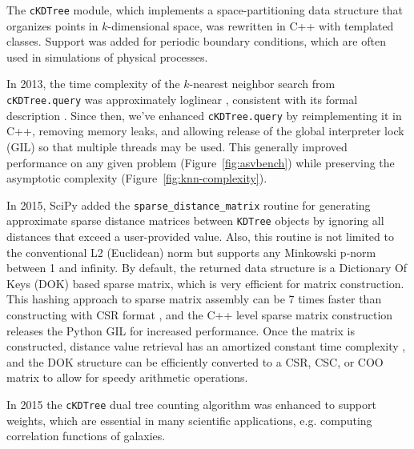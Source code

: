 The \texttt{cKDTree} module, which implements a space-partitioning data structure that
organizes points in $k$-dimensional space, was rewritten in C++ with templated classes. 
Support was added for periodic boundary conditions, which are often used 
in simulations of physical processes. 

In 2013, the time complexity of the $k$-nearest neighbor search from
\texttt{cKDTree.query} was approximately loglinear \cite{knn-jake},
consistent with its formal description \cite{kdtree-search-algo}.
Since then, we've enhanced \texttt{cKDTree.query} by reimplementing it in
C++, removing memory leaks, and allowing release of the global interpreter lock (GIL) so that
multiple threads may be used\cite{gh-4374}. This generally improved
performance on any given problem (Figure~\ref{fig:asvbench}) while
preserving the asymptotic complexity (Figure~\ref{fig:knn-complexity}).

In 2015, SciPy added the \texttt{sparse\_distance\_matrix} routine for generating 
approximate sparse distance matrices between \texttt{KDTree} objects by ignoring 
all distances that exceed a user-provided value. Also, this routine is not 
limited to the conventional L2 (Euclidean) norm but supports any Minkowski 
p-norm between 1 and infinity. By default, the returned data structure is a 
Dictionary Of Keys (DOK) based sparse matrix, which is very efficient for matrix 
construction. This hashing approach to sparse matrix assembly can be 7 times 
faster than constructing with CSR format
\cite{10.1007/978-3-540-75755-9_107}, and the C++ level sparse matrix construction 
releases the Python GIL for increased performance. Once the matrix is constructed, 
distance value retrieval has an amortized constant time complexity 
\cite{Cormen:2001:IA:580470}, and the DOK structure can be efficiently converted 
to a CSR, CSC, or COO matrix to allow for 
speedy arithmetic operations.

In 2015 the \texttt{cKDTree} dual tree counting algorithm\cite{Moore2000ar}
was enhanced to support weights\cite{ckdtree-weights}, which are
essential in many scientific applications, e.g. computing correlation
functions of galaxies\cite{0004-637X-750-1-38}.

